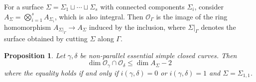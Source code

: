 \documentclass[11pt]{amsart}
\numberwithin{theorem}{section}
\newtheorem{proposition}[theorem]{Proposition}
\theoremstyle{definition}
\theoremstyle{remark}
\newcommand{\Ocal}{{\mathcal{O}}}
\newcommand{\<}{\langle}
\renewcommand{\>}{\rangle}
\begin{document}
For a surface $\Sigma = \Sigma_1 \sqcup \cdots  \sqcup \Sigma_s$ with connected components $\Sigma_i$, consider $A_\Sigma = \bigotimes_{i=1}^s A_{\Sigma_i}$, which is also integral. Then $\Ocal_\Gamma$ is the image of the ring homomorphism $A_{\Sigma |_\Gamma} \rightarrow A_\Sigma$ induced by the inclusion, where $\Sigma |_\Gamma$ denotes the surface obtained by cutting $\Sigma$ along $\Gamma$.

\begin{proposition}\label{DimIntersection}
Let $\gamma, \delta$ be non-parallel essential simple closed curves. Then
\[
\dim \mathcal{O}_{\gamma} \cap \Ocal_{\delta} \leq \dim A_\Sigma - 2
\]
where the equality holds if and only if $i(\gamma,\delta)=0$ or $i(\gamma, \delta) = 1$ and $\Sigma = \Sigma_{1,1}$.
\end{proposition}
\end{document}
